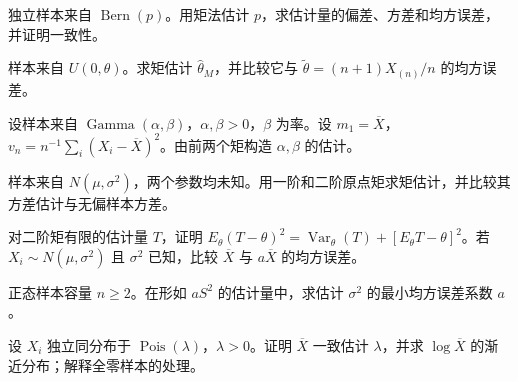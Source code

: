\begin{exercise}[伯努利矩估计]\label{q:B9.1}
独立样本来自 $\operatorname{Bern}(p)$。用矩法估计 $p$，求估计量的偏差、方差和均方误差，并证明一致性。\par{}\end{exercise}

\begin{exercise}[均匀分布的矩估计与极值估计]\label{q:B9.2}
样本来自 $U(0,\theta)$。求矩估计 $\widehat\theta_M$，并比较它与 $\widetilde\theta=(n+1)X_{(n)}/n$ 的均方误差。\par{}\end{exercise}

\begin{exercise}[伽马分布的两个矩参数]\label{q:B9.3}
设样本来自 $\operatorname{Gamma}(\alpha,\beta)$，$\alpha,\beta>0$，$\beta$ 为率。设 $m_1=\overline X$，$v_n=n^{-1}\sum_i(X_i-\overline X)^2$。由前两个矩构造 $\alpha,\beta$ 的估计。\par{}\end{exercise}

\begin{exercise}[正态分布的矩估计]\label{q:B9.4}
样本来自 $N(\mu,\sigma^2)$，两个参数均未知。用一阶和二阶原点矩求矩估计，并比较其方差估计与无偏样本方差。\par{}\end{exercise}

\begin{exercise}[偏差与均方误差分解]\label{q:B9.5}
对二阶矩有限的估计量 $T$，证明 $E_\theta(T-\theta)^2=\operatorname{Var}_\theta(T)+[E_\theta T-\theta]^2$。若 $X_i\sim N(\mu,\sigma^2)$ 且 $\sigma^2$ 已知，比较 $\overline X$ 与 $a\overline X$ 的均方误差。\par{}\end{exercise}

\begin{exercise}[样本方差的最小均方误差缩放]\label{q:B9.6}
正态样本容量 $n\ge2$。在形如 $aS^2$ 的估计量中，求估计 $\sigma^2$ 的最小均方误差系数 $a$。\par{}\end{exercise}

\begin{exercise}[一致性与渐近正态性]\label{q:B9.7}
设 $X_i$ 独立同分布于 $\operatorname{Pois}(\lambda)$，$\lambda>0$。证明 $\overline X$ 一致估计 $\lambda$，并求 $\log\overline X$ 的渐近分布；解释全零样本的处理。\par{}\end{exercise}

